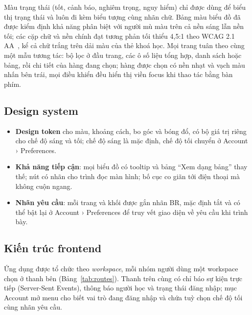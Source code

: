 Màu trạng thái (tốt, cảnh báo, nghiêm trọng, nguy hiểm) chỉ được dùng để biểu thị trạng thái và luôn đi kèm biểu tượng cùng nhãn chữ. Bảng màu biểu đồ đã được kiểm định khả năng phân biệt với người mù màu trên cả nền sáng lẫn nền tối; các cặp chữ và nền chính đạt tương phản tối thiểu 4,5:1 theo WCAG 2.1 AA~\cite{wcag21}, kể cả chữ trắng trên dải màu của thẻ khoá học. Mọi trang tuân theo cùng một mẫu tương tác: bộ lọc ở đầu trang, các ô số liệu tổng hợp, danh sách hoặc bảng, rồi chi tiết của hàng đang chọn; hàng được chọn có nền nhạt và vạch màu nhấn bên trái, mọi điều khiển đều hiển thị viền focus khi thao tác bằng bàn phím.

\subsection{Design system}

\begin{itemize}
  \item \textbf{Design token} cho màu, khoảng cách, bo góc và bóng đổ, có bộ giá trị riêng cho chế độ sáng và tối; chế độ sáng là mặc định, chế độ tối chuyển ở Account › Preferences.
  \item \textbf{Khả năng tiếp cận}: mọi biểu đồ có tooltip và bảng ``Xem dạng bảng'' thay thế; nút có nhãn cho trình đọc màn hình; bố cục co giãn tới điện thoại mà không cuộn ngang.
  \item \textbf{Nhãn yêu cầu}: mỗi trang và khối được gắn nhãn BR, mặc định tắt và có thể bật lại ở Account › Preferences để truy vết giao diện về yêu cầu khi trình bày.
\end{itemize}

\subsection{Kiến trúc frontend}

Ứng dụng được tổ chức theo \emph{workspace}, mỗi nhóm người dùng một workspace chọn ở thanh bên (Bảng~\ref{tab:routes}). Thanh trên cùng có chỉ báo sự kiện trực tiếp (Server-Sent Events), thông báo người học và trạng thái đăng nhập; mục Account mở menu cho biết vai trò đang đăng nhập và chứa tuỳ chọn chế độ tối cùng nhãn yêu cầu.

